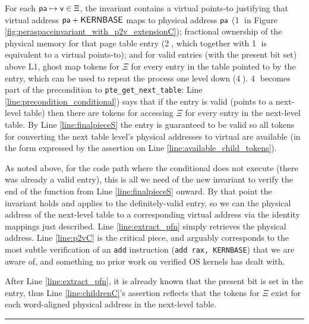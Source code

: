 For each $\textsf{pa}\mapsto \textsf{v} \in\Xi$, the invariant contains a virtual points-to justifying that virtual address
$\textsf{pa}+\textsf{KERNBASE}$ maps to physical address $\textsf{pa}$
(\textcircled{1} in Figure \ref{fig:peraspaceinvariant_with_p2v_extensionC});
fractional ownership of the physical memory for that page table entry (\textcircled{2}, which together with \textcircled{1} is equivalent
to a virtual points-to);
and for valid entries (with the present bit set) above L1, ghost map tokens for $\Xi$ for every entry in the table pointed to by the entry, which can be used
to repeat the process one level down (\textcircled{4}). 
\textcircled{4} becomes part of the precondition to \lstinline|pte_get_next_table|:
Line \ref{line:precondition_conditional}) says that if the entry is valid (points to a next-level table)
then there are tokens for accessing $\Xi$ for every entry in the next-level table.
By Line \ref{line:finalpieceS} the entry is guaranteed to be valid so all tokens for converting the next table level's physical addresses to virtual
are available (in the form expressed by the assertion on Line \ref{line:available_child_tokens}).

As noted above, for the code path where the conditional does not execute (there was already a valid entry), this is all we need of the new
invariant to verify the end of the function from Line \ref{line:finalpieceS} onward.
By that point the invariant holds and applies to the definitely-valid entry,
so we can the physical address of the next-level table to a corresponding virtual address via the identity mappings just described.
Line \ref{line:extract_pfn} simply retrieves the physical address.
Line \ref{line:p2vC} is the critical piece, and arguably corresponds to the most subtle verification of an \lstinline|add| instruction
(\lstinline|add rax, KERNBASE|)
that we are aware of, and something no prior work on verified OS kernels has dealt with.

After Line \ref{line:extract_pfn}, it is already known that the present bit is set in the entry,
thus Line \ref{line:childrenC}'s assertion reflects that the tokens for $\Xi$ exist for each word-aligned
physical address in the next-level table.

\hrule
{}

